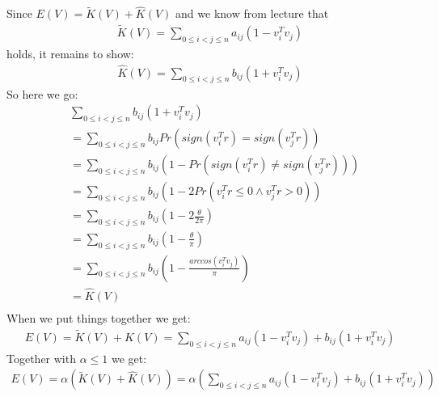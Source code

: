 \documentclass[11pt, oneside]{article}   	%
\begin{document}
Since $E(V) = \tilde{K}(V) + \hat{K}(V)$ and we know from lecture that
\begin{eqnarray*}
\tilde{K}(V) = \sum\limits_{0 \leq i < j \leq n} a_{ij}(1-v_i^Tv_j)
\end{eqnarray*}
holds, it remains to show:
\begin{eqnarray*}
\hat{K}(V) = \sum\limits_{0 \leq i < j \leq n} b_{ij}(1+v_i^Tv_j)
\end{eqnarray*}
So here we go:
\begin{eqnarray*}
&\sum\limits_{0 \leq i < j \leq n} b_{ij}(1+v_i^Tv_j) \\
&=\sum\limits_{0 \leq i < j \leq n} b_{ij}Pr(sign(v_i^Tr)=sign(v_j^Tr)) \\
&=\sum\limits_{0 \leq i < j \leq n} b_{ij}(1-Pr(sign(v_i^Tr)\neq sign(v_j^Tr))) \\
&=\sum\limits_{0 \leq i < j \leq n} b_{ij}(1-2Pr(v_i^Tr\leq 0 \wedge v_j^Tr > 0)) \\
&=\sum\limits_{0 \leq i < j \leq n} b_{ij}(1-2\frac{\theta}{2\pi}) \\
&=\sum\limits_{0 \leq i < j \leq n} b_{ij}(1-\frac{\theta}{\pi}) \\
&=\sum\limits_{0 \leq i < j \leq n} b_{ij}(1-\frac{arccos(v_i^Tv_j)}{\pi}) \\
&=\hat{K}(V) \\
\end{eqnarray*}
When we put things together we get:
\begin{eqnarray*}
E(V) = \tilde{K}(V) + \hat{K}(V) = \sum\limits_{0 \leq i < j \leq n} a_{ij}(1-v_i^Tv_j)+b_{ij}(1+v_i^Tv_j)
\end{eqnarray*}
Together with $\alpha \leq 1$ we get:
\begin{eqnarray*}
E(V) = \alpha(\tilde{K}(V) + \hat{K}(V)) = \alpha(\sum\limits_{0 \leq i < j \leq n} a_{ij}(1-v_i^Tv_j)+b_{ij}(1+v_i^Tv_j))
\end{eqnarray*}
\end{document}
